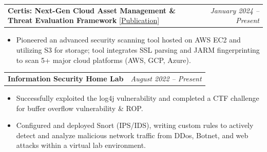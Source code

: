 \documentclass[letterpaper,11pt]{article}
\makeatletter
\newcommand{\resumeItem}[1]{
  \item\small{
    {#1 \vspace{-2pt}}
  }
}
\newcommand{\resumeProjectHeading}[2]{
    \item
    \begin{tabular*}{0.95\textwidth}{l@{\extracolsep{\fill}}r}
      \small#1 & #2 \\
    \end{tabular*}\vspace{-5pt}
}
\newcommand{\resumeItemListStart}{\begin{itemize}}
\newcommand{\resumeItemListEnd}{\end{itemize}\vspace{-5pt}}
\makeatother
\begin{document}
    \resumeProjectHeading
          {\textbf{Certis: Next-Gen Cloud Asset Management \& Threat Evaluation Framework} {\color{blue}[\href{https://doi.org/10.4236/jsea.2024.176026}{Publication}]}}{\textit{January 2024 -- Present}}
          \resumeItemListStart
            \resumeItem{Pioneered an advanced security scanning tool hosted on AWS EC2 and utilizing S3 for storage; tool integrates SSL parsing and JARM fingerprinting to scan 5+ major cloud platforms (AWS, GCP, Azure).}
            \resumeItemListEnd
      \resumeProjectHeading
          {\textbf{Information Security Home Lab}}{\textit{August 2022 -- Present}}
          \resumeItemListStart
            \resumeItem{Successfully exploited the log4j vulnerability and completed a CTF challenge for buffer overflow vulnerability \& ROP.}
            \resumeItem{Configured and deployed Snort (IPS/IDS), writing custom rules to actively detect and analyze malicious network traffic from DDos, Botnet, and web attacks within a virtual lab environment.}
            \resumeItemListEnd
          
\end{document}
